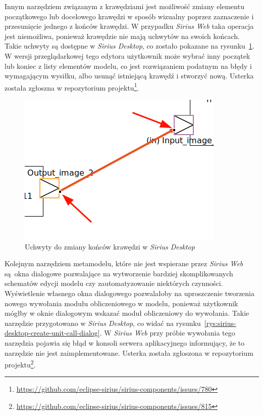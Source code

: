 Innym narzędziem związanym z krawędziami jest możliwość zmiany elementu
początkowego lub docelowego krawędzi w sposób wizualny poprzez zaznaczenie i
przesunięcie jednego z końców krawędzi. W przypadku \emph{Sirius Web} taka
operacja jest niemożliwa, ponieważ krawędzie nie mają uchwytów na swoich
końcach. Takie uchwyty są dostępne w \emph{Sirius Desktop}, co zostało pokazane
na rysunku~\ref{rys:sirius-desktop-reconnect-edge}. W wersji
przeglądarkowej tego edytora użytkownik może wybrać inny początek lub koniec
z listy elementów modelu, co jest rozwiązaniem podatnym na błędy i
wymagającym wysiłku, albo usunąć istniejącą krawędź i stworzyć nową.
Usterka została zgłoszna w repozytorium projektu\footnote{
	\url{https://github.com/eclipse-sirius/sirius-components/issues/780}
}.

\begin{figure}[!hb]
  \centering

  \includegraphics[width=0.5\linewidth]{./images/sirius-desktop-reconnect-edge.png}
  \caption{Uchwyty do zmiany końców krawędzi w \emph{Sirius
    Desktop}}\label{rys:sirius-desktop-reconnect-edge}
\end{figure}

Kolejnym narzędziem metamodelu, które nie jest wspierane przez \emph{Sirius
	Web} są okna dialogowe pozwalające na wytworzenie bardziej
skomplikowanych
schematów edycji modelu czy zautomatyzowanie niektórych czynności. Wyświetlenie
własnego okna dialogowego pozwalałoby na uproszczenie tworzenia nowego
wywołania modułu obliczeniowego w modelu, ponieważ użytkownik mógłby w oknie
dialogowym wskazać moduł obliczeniowy do wywołania. Takie narzędzie
przygotowano w \emph{Sirius Desktop}, co widać na
rysunku~\ref{rys:sirius-desktop-create-unit-call-dialog}. W \emph{Sirius
	Web} przy próbie wywołania tego narzędzia pojawia się błąd w konsoli
serwera
aplikacyjnego informujący, że to narzędzie nie jest zaimplementowane. Usterka
została zgłoszona w repozytorium projektu\footnote{
	\url{https://github.com/eclipse-sirius/sirius-components/issues/815}
}.

